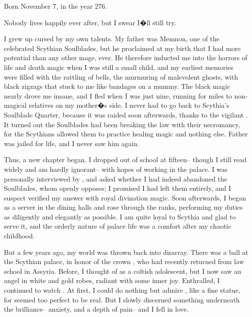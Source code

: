 \documentclass[char]{Kos}
\begin{document}
\name{\cButler{}}

Born November 7, in the year 276.

Nobody lives happily ever after, but I swear I�ll still try.

I grew up cursed by my own talents. My father was Memnon, one of the celebrated Scythian Soulblades, but he proclaimed at my birth that I had more potential than any other mage, ever. He therefore inducted me into the horrors of life and death magic when I was still a small child, and my earliest memories were filled with the rattling of bells, the murmuring of malevolent ghosts, with black zigzags that stuck to me like bandages on a mummy. The black magic nearly drove me insane, and I fled when I was just nine, running for miles to non-magical relatives on my mother�s side. I never had to go back to Scythia's Soulblade Quarter, because it was raided soon afterwards, thanks to the vigilant \cScythiaQueen{\Monarch} \cScythiaQueen{\nickname}. It turned out the Soulblades had been breaking the law with their necromancy, for the Scythians allowed them to practice healing magic and nothing else. Father was jailed for life, and I never saw him again.

Thus, a new chapter began. I dropped out of school at fifteen-- though I still read widely and am hardly ignorant-- with hopes of working in the palace. I was personally interviewed by\cScythiaQueen{\Monarch} \cScythiaQueen{\nickname}, and \cScythiaQueen{\they} asked whether I had indeed abandoned the Soulblades, whom \cScythiaQueen{\they} openly opposes; I promised I had left them entirely, and I suspect \cScythiaQueen{\they} verified my answer with royal divination magic. Soon afterwards, I began as a server in the dining halls and rose through the ranks, performing my duties as diligently and elegantly as possible. I am quite loyal to Scythia and glad to serve it, and the orderly nature of palace life was a comfort after my chaotic childhood.

But a few years ago, my world was thrown back into disarray. There was a ball at the Scythian palace, in honor of the crown \cBride{\prince} \cBride{\nickname}, who had recently returned from law school in Assyria. Before, I thought of \cBride{\them} as a coltish adolescent, but I now saw an angel in white and gold robes, radiant with some inner joy. Enthralled, I continued to watch \cBride{\them}. At first, I could do nothing but admire \cBride{\them}, like a fine statue, for \cBride{\they} seemed too perfect to be real. But I slowly discerned something underneath the brilliance-- anxiety, and a depth of pain-- and I fell in love. 
\end{document}
